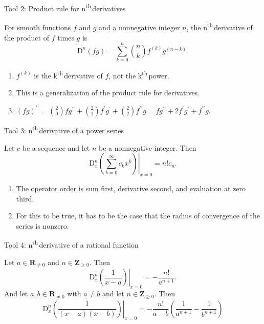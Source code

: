 \documentclass[portrait,fleqn,12pt]{beamer}
\newcommand{\reals}{\mathbf{R}}
\newcommand{\integers}{\mathbf{Z}}
\newcommand{\D}{\mathrm{D}}
\newcommand{\nth}{n\textsuperscript{th}\,}
\newcommand{\kth}{k\textsuperscript{th}\,}
\newenvironment{handlist}
   {\begin{enumerate}[\faHandPointRight]
       \addtolength{\itemsep}{0.0\itemsep}}
     {\end{enumerate}}
\begin{document}
\begin{frame}{Tool 2:  Product rule for \nth derivatives}

For smooth functions $f$ and $g$ and a nonnegative integer $n$, the \nth derivative of the product of $f$ times $g$ is
\begin{equation}
       \D^n (f g) = \sum_{k=0}^n  \binom{n}{k}  f^{(k)} g^{(n-k)}.
\end{equation}
\begin{handlist}
\item $ f^{(k)}$ is the \kth derivative of $f$, not the \kth power.
\item This is a generalization of the product rule for derivatives.
\item $(f g)^{\prime \prime} = \binom{2}{0} f g^{\prime \prime} + \binom{2}{1} f^\prime  g^{\prime} +
\binom{2}{2} f^{\prime \prime} g  = f g^{\prime \prime} + 2  f^\prime  g^{\prime} + f^{\prime \prime} g$.
\end{handlist}
\end{frame}


\begin{frame}{Tool 3:  \nth derivative of a power series}

Let $c$ be a sequence and let $n$ be a nonnegative integer.  Then
\begin{equation}
      \left.  \D^n_x \left( \sum_{k=0}^\infty c_k x^k  \right)  \right \vert_{x=0} = n!  c_n.
\end{equation}
\begin{handlist}
 \item The operator order is sum first, derivative second, and  evaluation at zero third.
   \item For this to be true, it has to be the case that  the radius of convergence of the series is nonzero.
\end{handlist}
\end{frame}

\begin{frame}{Tool 4:   \nth derivative of a rational function}

Let $a \in \reals_{\neq 0} $ and $n \in \integers_{\geq 0}$. Then
\begin{equation*}
      \left.  \D^n_x \left(\frac{1}{x-a}  \right) \right \vert_{x=0} = -\frac{n!}{a^{n+1}}.
\end{equation*}
And let $a,b \in \reals_{\neq 0} $ with $a \neq b$  and let $n \in \integers_{\geq 0}$. Then
\begin{equation*}
      \left.  \D^n_x \left(\frac{1}{(x-a)(x-b)}  \right) \right \vert_{x=0} = -\frac{n!}{a-b} \left(\frac{1}{a^{n+1}} - \frac{1}{b^{n+1}} \right)
\end{equation*}
\end{frame}
\end{document}
